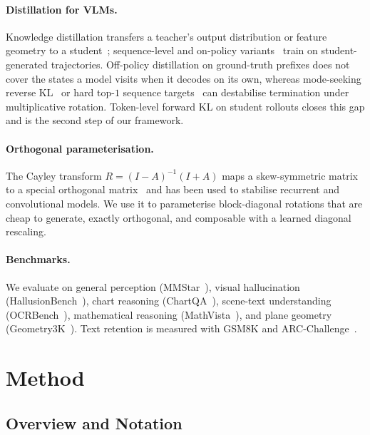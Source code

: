 \documentclass[10pt,twocolumn,letterpaper]{article}
\begin{document}
\paragraph{Distillation for VLMs.}
Knowledge distillation transfers a teacher's output distribution or feature
geometry to a student~\citep{hinton2015distilling,park2019rkd}; sequence-level
and on-policy variants~\citep{kim2016sequence,gu2024minillm,agarwal2024gkd}
train on student-generated trajectories. Off-policy distillation on
ground-truth prefixes does not cover the states a model visits when it decodes
on its own, whereas mode-seeking reverse KL~\citep{gu2024minillm} or hard top-$1$
sequence targets~\citep{kim2016sequence} can destabilise termination under
multiplicative rotation. Token-level forward KL on student rollouts closes this
gap and is the second step of our framework.

\paragraph{Orthogonal parameterisation.}
The Cayley transform $R=(I-A)^{-1}(I+A)$ maps a skew-symmetric matrix to a
special orthogonal matrix~\citep{golub2013matrix} and has been used to
stabilise recurrent and convolutional models. We use it to parameterise
block-diagonal rotations that are cheap to generate, exactly orthogonal, and
composable with a learned diagonal rescaling.

\paragraph{Benchmarks.}
We evaluate on general perception (MMStar~\citep{chen2024mmstar}), visual
hallucination (HallusionBench~\citep{guan2024hallusionbench}), chart reasoning
(ChartQA~\citep{masry2022chartqa}), scene-text understanding
(OCRBench~\citep{liu2023ocrbench}), mathematical reasoning
(MathVista~\citep{lu2024mathvista}), and plane geometry
(Geometry3K~\citep{lu2021geometry3k}). Text retention is measured with GSM8K
\citep{cobbe2021gsm8k} and ARC-Challenge~\citep{clark2018arc}.

\section{Method}
\label{sec:method}

\subsection{Overview and Notation}
\label{sec:overview}
\end{document}
